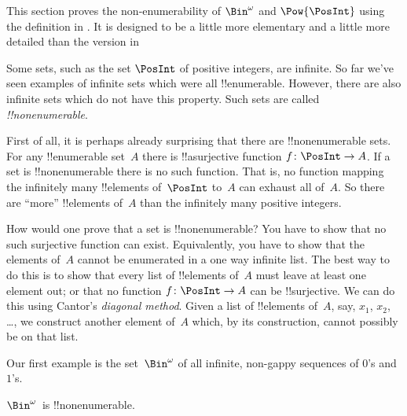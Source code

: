 \documentclass[../../../include/open-logic-section]{subfiles}
\begin{document}

\begin{editorial}
  This section proves the non-enumerability of $\Bin^\omega$ and
  $\Pow{\PosInt}$ using the definition in . It is
  designed to be a little more elementary and a little more detailed
  than the version in 
\end{editorial}

Some sets, such as the set $\PosInt$ of positive integers, are
infinite. So far we've seen examples of infinite sets which were all
!!{enumerable}. However, there are also infinite sets which do not
have this property. Such sets are called \emph{!!{nonenumerable}}.

First of all, it is perhaps already surprising that there are
!!{nonenumerable} sets.  For any !!{enumerable} set~$A$ there is
!!a{surjective} function $f \colon \PosInt \to A$.  If a set is
!!{nonenumerable} there is no such function.  That is, no function
mapping the infinitely many !!{element}s of~$\PosInt$ to~$A$ can
exhaust all of~$A$.  So there are ``more'' !!{element}s of~$A$ than
the infinitely many positive integers.

How would one prove that a set is !!{nonenumerable}? You have to show
that no such surjective function can exist. Equivalently, you have to
show that the elements of~$A$ cannot be enumerated in a one way
infinite list.  The best way to do this is to show that every list of
!!{element}s of~$A$ must leave at least one element out; or that no
function $f\colon \PosInt \to A$ can be !!{surjective}.  We can do this
using Cantor's \emph{diagonal method}.  Given a list of !!{element}s
of~$A$, say, $x_1$, $x_2$, \dots, we construct another element of~$A$
which, by its construction, cannot possibly be on that list.

Our first example is the set~$\Bin^\omega$ of all infinite, non-gappy
sequences of $0$'s and $1$'s.

\begin{thm}
$\Bin^\omega$~is !!{nonenumerable}.
\end{thm}
\end{document}

